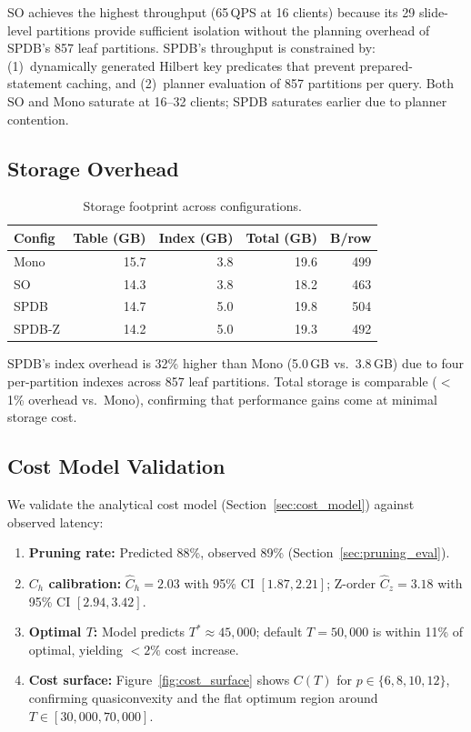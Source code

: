 \documentclass[sigconf]{acmart}
\begin{document}
SO achieves the highest throughput (65\,QPS at 16 clients) because its 29 slide-level partitions provide sufficient isolation without the planning overhead of SPDB's 857 leaf partitions.
SPDB's throughput is constrained by: (1)~dynamically generated Hilbert key predicates that prevent prepared-statement caching, and (2)~planner evaluation of 857 partitions per query.
Both SO and Mono saturate at 16--32 clients; SPDB saturates earlier due to planner contention.

\subsection{Storage Overhead}

\begin{table}[t]
\centering
\caption{Storage footprint across configurations.}
\label{tab:storage}
\scriptsize
\begin{tabular}{@{}lrrrr@{}}
\toprule
\textbf{Config} & \textbf{Table (GB)} & \textbf{Index (GB)} & \textbf{Total (GB)} & \textbf{B/row} \\
\midrule
Mono & 15.7 & 3.8 & 19.6 & 499 \\
SO & 14.3 & 3.8 & 18.2 & 463 \\
SPDB & 14.7 & 5.0 & 19.8 & 504 \\
SPDB-Z & 14.2 & 5.0 & 19.3 & 492 \\
\bottomrule
\end{tabular}
\end{table}

SPDB's index overhead is 32\% higher than Mono (5.0\,GB vs.\ 3.8\,GB) due to four per-partition indexes across 857 leaf partitions.
Total storage is comparable ($<$1\% overhead vs.\ Mono), confirming that performance gains come at minimal storage cost.

\subsection{Cost Model Validation}
\label{sec:cost_validation}

We validate the analytical cost model (Section~\ref{sec:cost_model}) against observed latency:

\begin{enumerate}
\item \textbf{Pruning rate:} Predicted 88\%, observed 89\% (Section~\ref{sec:pruning_eval}).
\item \textbf{$C_h$ calibration:} $\hat{C}_h = 2.03$ with 95\% CI $[1.87, 2.21]$; Z-order $\hat{C}_z = 3.18$ with 95\% CI $[2.94, 3.42]$.
\item \textbf{Optimal $T$:} Model predicts $T^* \approx 45{,}000$; default $T = 50{,}000$ is within 11\% of optimal, yielding $<2\%$ cost increase.
\item \textbf{Cost surface:} Figure~\ref{fig:cost_surface} shows $C(T)$ for $p \in \{6,8,10,12\}$, confirming quasiconvexity and the flat optimum region around $T \in [30{,}000, 70{,}000]$.
\end{enumerate}
\end{document}
